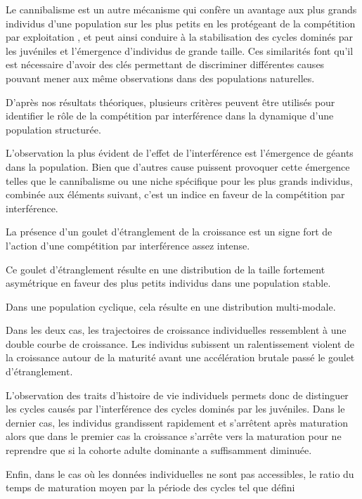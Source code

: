 Le cannibalisme est un autre mécanisme qui confère un avantage aux
plus grands individus d'une population sur les plus petits en les protégeant de la
compétition par exploitation \autocites{claessen2000a,claessen2002a}, et peut
ainsi conduire à la stabilisation des cycles dominés par les juvéniles et
l'émergence d'individus de grande taille. Ces similarités font qu'il est
nécessaire d'avoir des clés permettant de discriminer différentes causes pouvant
mener aux même observations dans des populations naturelles. 

D'après nos résultats théoriques, plusieurs critères peuvent être utilisés pour
identifier le rôle de la compétition par interférence dans la dynamique d'une
population structurée. 
\begin{enumerate*}[label=(\roman*)]
\item L'observation la plus évident de l'effet de l'interférence est l'émergence
de géants dans la population. Bien que d'autres cause puissent provoquer cette
émergence telles que le cannibalisme ou une niche spécifique pour les plus
grands individus, combinée aux éléments suivant, c'est un indice en faveur
de la compétition par interférence. 
\item La présence d'un goulet d'étranglement de la croissance est un signe fort
de l'action d'une compétition par interférence assez intense.
\item Ce goulet d'étranglement résulte en une distribution de la taille
fortement asymétrique en faveur des plus petits individus dans une population
stable. 
\item Dans une population cyclique, cela résulte en une distribution
multi-modale.
\item Dans les deux cas, les trajectoires de croissance individuelles
ressemblent à une double courbe de croissance. Les individus subissent un
ralentissement violent de la croissance autour de la maturité avant une
accélération brutale passé le goulet d'étranglement. 
\item L'observation des traits d'histoire de vie individuels permets donc de
distinguer les cycles causés par l'interférence des cycles dominés par les
juvéniles. Dans le dernier cas, les individus grandissent rapidement et
s'arrêtent après maturation alors que dans le premier cas la croissance s'arrête
vers la maturation pour ne reprendre que si la cohorte adulte dominante a
suffisamment diminuée. 
\item Enfin, dans le cas où les données individuelles ne sont pas accessibles,
le ratio du temps de maturation moyen par la période des cycles tel que défini

\end{enumerate*}

